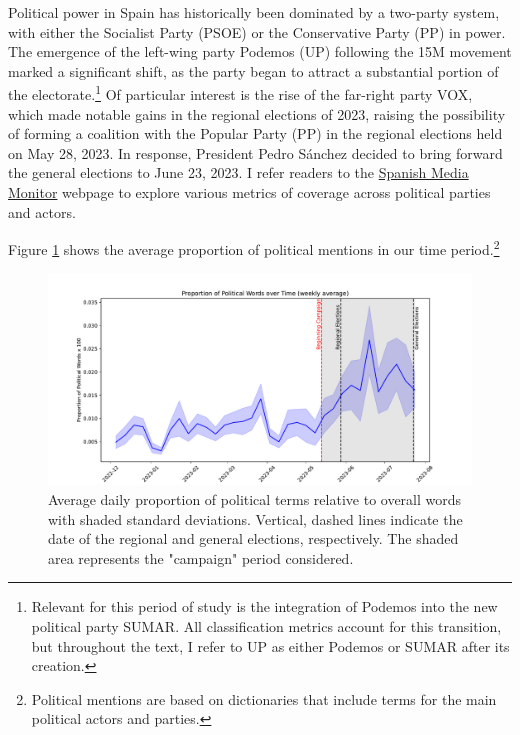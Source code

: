 \documentclass[12pt]{article}
\begin{document}
	Political power in Spain has historically been dominated by a two-party system, with either the Socialist Party (PSOE) or the Conservative Party (PP) in power. The emergence of the left-wing party Podemos (UP) following the 15M movement marked a significant shift, as the party began to attract a substantial portion of the electorate.\footnote{Relevant for this period of study is the integration of Podemos into the new political party SUMAR. All classification metrics account for this transition, but throughout the text, I refer to UP as either Podemos or SUMAR after its creation.} Of particular interest is the rise of the far-right party VOX, which made notable gains in the regional elections of 2023, raising the possibility of forming a coalition with the Popular Party (PP) in the regional elections held on May 28, 2023. In response, President Pedro Sánchez decided to bring forward the general elections to June 23, 2023. I refer readers to the \href{https://luisignaciomenendez.github.io/media_monitor/index.html}{Spanish Media Monitor} webpage to explore various metrics of coverage across political parties and actors.
	
	Figure \ref{fig:coverage} shows the average proportion of political mentions in our time period.\footnote{Political mentions are based on dictionaries that include terms for the main political actors and parties.}
	
	\begin{figure}[h!]
		
		\centering
		\includegraphics[width=150mm]{figures/political_words2}
		\caption{Average daily proportion of political terms relative to overall words with shaded standard deviations. Vertical, dashed lines indicate the date of the regional and general elections, respectively. The shaded area represents the "campaign" period considered.}
		\label{fig:coverage}
	\end{figure}
	
\end{document}

